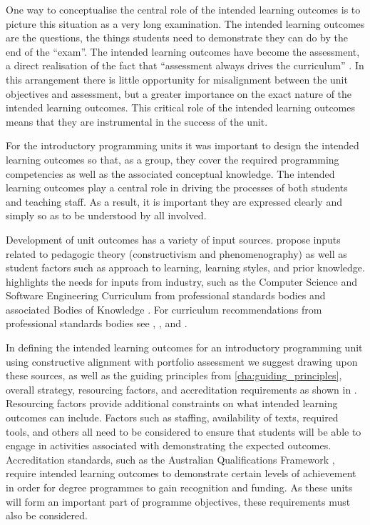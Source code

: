 One way to conceptualise the central role of the intended learning outcomes is to picture this situation as a very long examination. The intended learning outcomes are the questions, the things students need to demonstrate they can do by the end of the ``exam''. The intended learning outcomes have become the assessment, a direct realisation of the fact that ``assessment always drives the curriculum'' \cite{Ramsden:1992}.  In this arrangement there is little opportunity for misalignment between the unit objectives and assessment, but a greater importance on the exact nature of the intended learning outcomes. This critical role of the intended learning outcomes means that they are instrumental in the success of the unit. 

For the introductory programming units it was important to design the intended learning outcomes so that, as a group, they cover the required programming competencies as well as the associated conceptual knowledge. The intended learning outcomes play a central role in driving the processes of both students and teaching staff. As a result, it is important they are expressed clearly and simply so as to be understood by all involved.

Development of unit outcomes has a variety of input sources. \citet{Thota:2010} propose inputs related to pedagogic theory (constructivism and phenomenography) as well as student factors such as approach to learning, learning styles, and prior knowledge. \citet{Armarego:2009} highlights the needs for inputs from industry, such as the Computer Science and Software Engineering Curriculum from professional standards bodies and associated Bodies of Knowledge \citet{Abran:2001}. For curriculum recommendations from professional standards bodies see \citet{Lethbridge:2006}, \citet{Cassel:2008}, and \citet{CSC2013}.

In defining the intended learning outcomes for an introductory programming unit using constructive alignment with portfolio assessment we suggest drawing upon these sources, as well as the guiding principles from \cref{cha:guiding_principles}, overall strategy, resourcing factors, and accreditation requirements as shown in . Resourcing factors provide additional constraints on what intended learning outcomes can include. Factors such as staffing, availability of texts, required tools, and others all need to be considered to ensure that students will be able to engage in activities associated with demonstrating the expected outcomes. Accreditation standards, such as the Australian Qualifications Framework \cite{AQF:2013}, require intended learning outcomes to demonstrate certain levels of achievement in order for degree programmes to gain recognition and funding. As these units will form an important part of programme objectives, these requirements must also be considered. 

